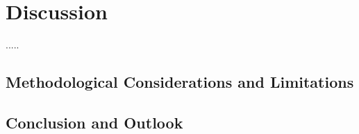 \section{Discussion}

.....

\subsection{Methodological Considerations and Limitations}

\subsection{Conclusion and Outlook}
